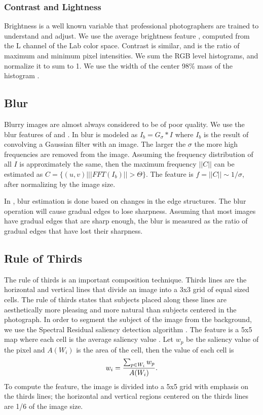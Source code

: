 \documentclass[conference,a4paper]{IEEEtran}
\begin{document}
  \subsubsection{Contrast and Lightness}
  Brightness is a well known variable that professional photographers are trained to understand and adjust.  We use the average brightness feature \cite{ke2006design}, \cite{chen2014aesthetic} computed from the L channel of the Lab color space.  Contrast is similar, and is the ratio of maximum and minimum pixel intensities.  We sum the RGB level histograms, and normalize it to sum to 1.  We use the width of the center 98\% mass of the histogram \cite{ke2006design}.

   \subsection{Blur}
  Blurry images are almost always considered to be of poor quality.  We use the blur features of \cite{ke2006design} and \cite{tong2004blur}.  In \cite{ke2006design} blur is modeled as $I_b = G_\sigma * I$ where $I_b$ is the result of convolving a Gaussian filter with an image.  The larger the $\sigma$ the more high frequencies are removed from the image.  Assuming the frequency distribution of all $I$ is approximately the same, then the maximum frequency $||C||$ can be estimated as $C = \{(u, v) | ||FFT(I_b)|| > \Theta\}$.  The feature is $f = ||C|| \sim 1/\sigma$, after normalizing by the image size.

  In \cite{tong2004blur}, blur estimation is done based on changes in the edge structures.  The blur operation will cause gradual edges to lose sharpness.  Assuming that most images have gradual edges that are sharp enough, the blur is measured as the ratio of gradual edges that have lost their sharpness.

  \subsection{Rule of Thirds}
  The rule of thirds is an important composition technique.  Thirds lines are the horizontal and vertical lines that divide an image into a 3x3 grid of equal sized cells.  The rule of thirds states that subjects placed along these lines are aesthetically more pleasing and more natural than subjects centered in the photograph.  In order to segment the subject of the image from the background, we use the Spectral Residual saliency detection algorithm \cite{hou2007saliency}.  The feature is a 5x5 map where each cell is the average saliency value \cite{mai2011rule}.  Let $w_p$ be the saliency value of the pixel and $A(W_i)$ is the area of the cell, then the value of each cell is
  \begin{equation}
    w_i = {\sum_{p \in W_i} w_p \over A(W_i)} .
  \end{equation}
  To compute the feature, the image is divided into a 5x5 grid with emphasis on the thirds lines; the horizontal and vertical regions centered on the thirds lines are 1/6 of the image size.
\end{document}
